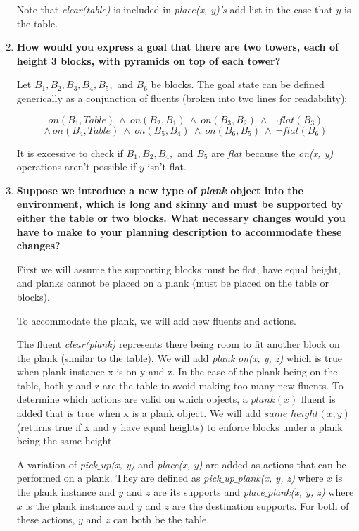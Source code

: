 \documentclass[11pt, letterpaper]{hw}
\begin{document}
\begin{enumerate}
Note that \textit{clear(table)} is included in \textit{place(x, y)'s} add list in the case that $y$ is the table.

\item \textbf{How would you express a goal that there are two towers, each of height 3 blocks, with pyramids on top of each tower?}

Let $B_1, B_2, B_3, B_4, B_5,$ and $B_6$ be blocks. The goal state can be defined generically as a conjunction of fluents (broken into two lines for readability):

$$on(B_1, Table) \ \wedge \ on(B_2, B_1) \ \wedge \ on(B_3, B_2) \ \wedge \ \neg flat(B_3)$$
$$\wedge \ on(B_4, Table) \ \wedge \ on(B_5, B_4) \ \wedge \ on(B_6, B_5) \ \wedge \ \neg flat(B_6)$$

It is excessive to check if $B_1, B_2, B_4,$ and $B_5$ are \textit{flat} because the \textit{on(x, y)} operations aren't possible if $y$ isn't flat.

\item \textbf{Suppose we introduce a new type of \emph{plank} object into the environment, which is long and skinny and must be supported by either the table or two blocks. What necessary changes would you have to make to your planning description to accommodate these changes?}

First we will assume the supporting blocks must be flat, have equal height, and planks cannot be placed on a plank (must be placed on the table or blocks).

To accommodate the plank, we will add new fluents and actions.

The fluent \textit{clear(plank)} represents there being room to fit another block on the plank (similar to the table). We will add \textit{plank$
\_$on(x, y, z)} which is true when plank instance x is on y and z. In the case of the plank being on the table, both y and z are the table to avoid making too many new fluents. To determine which actions are valid on which objects, a $plank(x)$ fluent is added that is true when x is a plank object. We will add $same\_height(x, y)$ (returns true if x and y have equal heights) to enforce blocks under a plank being the same height.

A variation of \textit{pick$\_$up(x, y)} and \textit{place(x, y)} are added as actions that can be performed on a plank. They are defined as \textit{pick$\_$up$\_$plank(x, y, z)} where $x$ is the plank instance and $y$ and $z$ are its supports and \textit{place$\_$plank(x, y, z)} where $x$ is the plank instance and $y$ and $z$ are the destination supports. For both of these actions, $y$ and $z$ can both be the table.


\end{enumerate}
\end{document}
